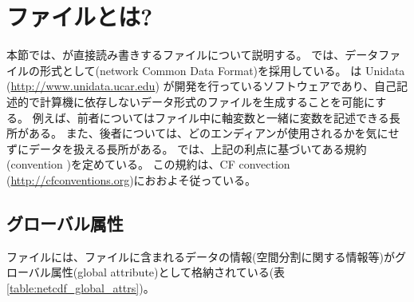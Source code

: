\section{\scalenetcdf ファイルとは?} \label{sec:netcdf}

本節では、{\scalelib}が直接読み書きする{\scalenetcdf}ファイルについて説明する。
\scalelib では、データファイルの形式として{\netcdf}(network Common Data Format)を採用している。
\Netcdf は Unidata (\url{http://www.unidata.ucar.edu}) が開発を行っているソフトウェアであり、自己記述的で計算機に依存しないデータ形式のファイルを生成することを可能にする。
例えば、前者についてはファイル中に軸変数と一緒に変数を記述できる長所がある。
また、後者については、どのエンディアンが使用されるかを気にせずにデータを扱える長所がある。
\scalelib では、上記の利点に基づいてある規約(\scalenetcdf convention )を定めている。
この規約は、CF convection (\url{http://cfconventions.org})におおよそ従っている。

\subsection{グローバル属性} \label{sec:global_attr}
\scalenetcdf ファイルには、ファイルに含まれるデータの情報(空間分割に関する情報等)がグローバル属性(global attribute)として格納されている(表\ref{table:netcdf_global_attrs})。


